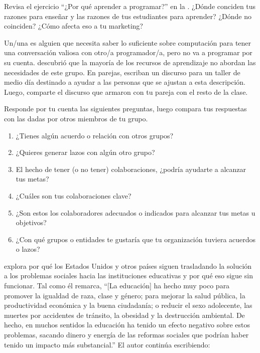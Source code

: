 Revisa el ejercicio ``¿Por qué aprender a programar?'' en la .
¿Dónde conciden tus razones para enseñar y las razones de tus estudiantes para aprender?
¿Dónde no coinciden?
¿Cómo afecta eso a tu marketing?


Un/una 
es alguien que necesita saber lo suficiente sobre computación
para tener una conversación valiosa con otro/a programador/a,
pero no va a programar por su cuenta.
\cite{Wang2018} descubrió que la mayoría de los recursos de aprendizaje no abordan las necesidades de este grupo.
En parejas,
escriban un discurso para un taller de medio día destinado a ayudar a las personas que se ajustan a esta descripción.
Luego, comparte el discurso que armaron con tu pareja con el resto de la clase.

Responde por tu cuenta las siguientes preguntas,
luego compara tus respuestas con las dadas por otros miembros de tu grupo.

\begin{enumerate}

\item
¿Tienes algún acuerdo o relación con otros grupos?

\item
¿Quieres generar lazos con algún otro grupo?

\item
El hecho de tener (o no tener) colaboraciones, 
¿podría ayudarte a alcanzar tus metas?

\item
¿Cuáles son tus colaboraciones clave?

\item
¿Son estos los colaboradores adecuados o indicados para alcanzar tus metas u objetivos?

\item
¿Con qué grupos o entidades te gustaría que tu organización
tuviera acuerdos o lazos?



\end{enumerate}


\cite{Laba2008} explora por qué los Estados Unidos y otros países
siguen trasladando la solución a los problemas sociales hacia las instituciones educativas 
y por qué eso sigue sin funcionar.
Tal como él remarca,
``[La educación] ha hecho muy poco para promover la igualdad de raza, clase y género;
para mejorar la salud pública, la productividad económica y la buena ciudadanía;
o reducir el sexo adolecente, las muertes por accidentes de tránsito, la obesidad y la destrucción ambiental.
De hecho,
en muchos sentidos la educación ha tenido un efecto negativo sobre estos problemas,
sacando dinero y energía de las reformas sociales que podrían haber tenido un impacto más substancial.''
El autor continúa escribiendo: 

